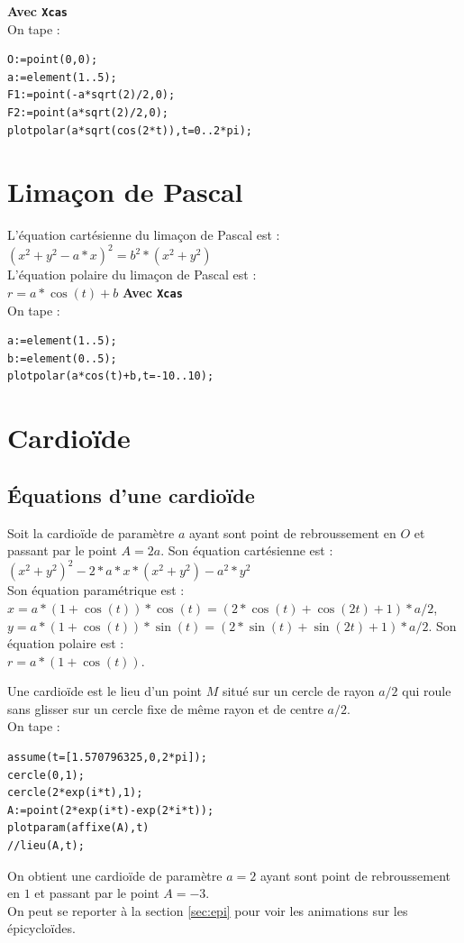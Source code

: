 \documentclass[a4paper,11pt]{book}
\begin{document}
{\bf Avec {\tt Xcas}}\\
On tape :\\
\begin{verbatim}
O:=point(0,0);
a:=element(1..5);
F1:=point(-a*sqrt(2)/2,0);
F2:=point(a*sqrt(2)/2,0);
plotpolar(a*sqrt(cos(2*t)),t=0..2*pi);
\end{verbatim}

\section{Lima\c{c}on de Pascal}
L'\'equation cart\'esienne du lima\c{c}on de Pascal est :\\
$(x^2+y^2-a*x)^2=b^2*(x^2+y^2)$\\
L'\'equation polaire du lima\c{c}on de Pascal est :\\
$r=a*\cos(t)+b$
{\bf Avec {\tt Xcas}}\\
On tape :\\
\begin{verbatim}
a:=element(1..5);
b:=element(0..5);
plotpolar(a*cos(t)+b,t=-10..10);
\end{verbatim}
\section{Cardio\"ide}
\subsection{\'Equations d'une cardio\"{i}de}
Soit la cardio\"ide de param\`etre $a$ ayant sont point de rebroussement en $O$ 
et passant par le point $A=2a$.
Son \'equation cart\'esienne est :\\
$(x^2+y^2)^2-2*a*x*(x^2+y^2)-a^2*y^2$\\
Son \'equation param\'etrique est :\\
$x=a*(1+\cos(t))*\cos(t)=(2*\cos(t)+\cos(2t)+1)*a/2$,\\
$y=a*(1+\cos(t))*\sin(t)=(2*\sin(t)+\sin(2t)+1)*a/2$.
Son \'equation polaire est :\\
$r=a*(1+\cos(t))$.

Une cardio\"ide est le lieu d'un point $M$ situ\'e sur un cercle de rayon 
$a/2$ qui roule sans glisser sur un 
cercle fixe de m\^eme rayon et de centre $a/2$.\\
On tape :
\begin{verbatim}
assume(t=[1.570796325,0,2*pi]);
cercle(0,1);
cercle(2*exp(i*t),1);
A:=point(2*exp(i*t)-exp(2*i*t));
plotparam(affixe(A),t)
//lieu(A,t);
\end{verbatim}
On obtient une cardio\"ide de param\`etre $a=2$ ayant sont point de rebroussement
en $1$ et passant par le point $A=-3$.\\
On peut se reporter \`a la section \ref{sec:epi} pour voir les animations sur 
les \'epicyclo\"ides.
\end{document}
